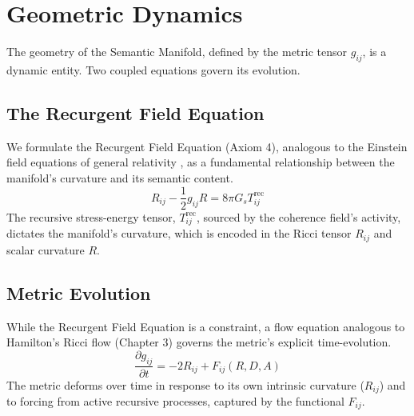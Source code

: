 
\section{Geometric Dynamics}
\label{sec:geometric_dynamics}

The geometry of the Semantic Manifold, defined by the metric tensor \(g_{ij}\), is a dynamic entity. Two coupled equations govern its evolution.


\subsection{The Recurgent Field Equation}
\label{sec:the_recurgent_field_equation}

We formulate the Recurgent Field Equation (Axiom 4), analogous to the Einstein field equations of general relativity \autocite{Einstein1915}, as a fundamental relationship between the manifold's curvature and its semantic content.
\begin{equation}
R_{ij} - \frac{1}{2}g_{ij}R = 8\pi G_s T^{\text{rec}}_{ij}
\end{equation}
The recursive stress-energy tensor, \(T^{\text{rec}}_{ij}\), sourced by the coherence field's activity, dictates the manifold's curvature, which is encoded in the Ricci tensor \(R_{ij}\) and scalar curvature \(R\).


\subsection{Metric Evolution}
\label{sec:metric_evolution}

While the Recurgent Field Equation is a constraint, a flow equation analogous to Hamilton's Ricci flow (Chapter 3) \autocite{Hamilton1982} governs the metric's explicit time-evolution.
\begin{equation}
\frac{\partial g_{ij}}{\partial t} = -2 R_{ij} + F_{ij}(R, D, A)
\end{equation}
The metric deforms over time in response to its own intrinsic curvature (\(R_{ij}\)) and to forcing from active recursive processes, captured by the functional \(F_{ij}\).

